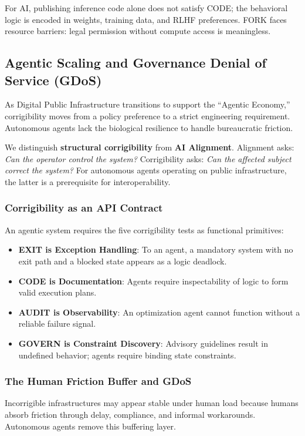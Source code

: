 \documentclass{article}
\begin{document}
For AI, publishing inference code alone does not satisfy CODE; the behavioral logic is encoded in weights, training data, and RLHF preferences. FORK faces resource barriers: legal permission without compute access is meaningless.

\subsection{Agentic Scaling and Governance Denial of Service (GDoS)}
\label{subsec:gdos}

As Digital Public Infrastructure transitions to support the ``Agentic Economy,'' corrigibility moves from a policy preference to a strict engineering requirement. Autonomous agents lack the biological resilience to handle bureaucratic friction.

We distinguish \textbf{structural corrigibility} from \textbf{AI Alignment}. Alignment asks: \textit{Can the operator control the system?} Corrigibility asks: \textit{Can the affected subject correct the system?} For autonomous agents operating on public infrastructure, the latter is a prerequisite for interoperability.

\subsubsection{Corrigibility as an API Contract}
An agentic system requires the five corrigibility tests as functional primitives:
\begin{itemize}[noitemsep]
    \item \textbf{EXIT is Exception Handling}: To an agent, a mandatory system with no exit path and a blocked state appears as a logic deadlock.
    \item \textbf{CODE is Documentation}: Agents require inspectability of logic to form valid execution plans.
    \item \textbf{AUDIT is Observability}: An optimization agent cannot function without a reliable failure signal.
    \item \textbf{GOVERN is Constraint Discovery}: Advisory guidelines result in undefined behavior; agents require binding state constraints.
\end{itemize}

\subsubsection{The Human Friction Buffer and GDoS}
Incorrigible infrastructures may appear stable under human load because humans absorb friction through delay, compliance, and informal workarounds. Autonomous agents remove this buffering layer.
\end{document}

